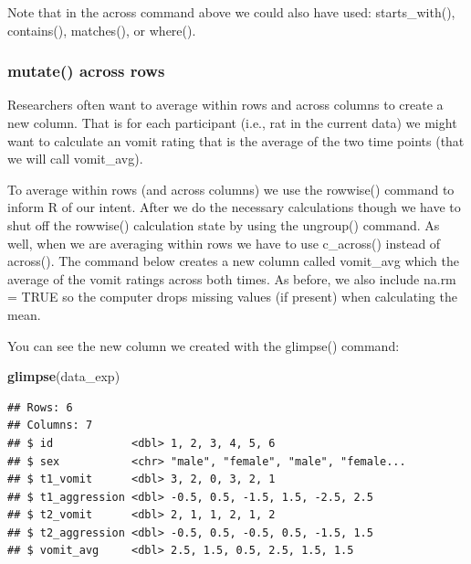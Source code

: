 \documentclass[
]{krantz}
\makeatletter
\newenvironment{Shaded}{\begin{snugshade}}{\end{snugshade}}
\newcommand{\DataTypeTok}[1]{\textcolor[rgb]{0.27,0.27,0.27}{#1}}
\newcommand{\KeywordTok}[1]{\textcolor[rgb]{0.27,0.27,0.27}{\textbf{#1}}}
\newcommand{\NormalTok}[1]{#1}
\newcommand{\OperatorTok}[1]{\textcolor[rgb]{0.43,0.43,0.43}{\textbf{#1}}}
\newcommand{\OtherTok}[1]{\textcolor[rgb]{0.37,0.37,0.37}{#1}}
\newcommand{\StringTok}[1]{\textcolor[rgb]{0.5,0.5,0.5}{#1}}
\newenvironment{kframe}{%
\medskip{}
\setlength{\fboxsep}{.8em}
 \def\at@end@of@kframe{}%
 \ifinner\ifhmode%
  \def\at@end@of@kframe{\end{minipage}}%
  \begin{minipage}{\columnwidth}%
 \fi\fi%
 \def\FrameCommand##1{\hskip\@totalleftmargin \hskip-\fboxsep
 \colorbox{shadecolor}{##1}\hskip-\fboxsep
     \hskip-\linewidth \hskip-\@totalleftmargin \hskip\columnwidth}%
 \MakeFramed {\advance\hsize-\width
   \@totalleftmargin\z@ \linewidth\hsize
   \@setminipage}}%
 {\par\unskip\endMakeFramed%
 \at@end@of@kframe}
\renewenvironment{Shaded}{\begin{kframe}}{\end{kframe}}
\makeatother
\begin{document}
Note that in the across command above we could also have used: starts\_with(), contains(), matches(), or where().

\hypertarget{mutate-across-rows}{%
\subsubsection{mutate() across rows}\label{mutate-across-rows}}

Researchers often want to average within rows and across columns to create a new column. That is for each participant (i.e., rat in the current data) we might want to calculate an vomit rating that is the average of the two time points (that we will call vomit\_avg).

To average within rows (and across columns) we use the rowwise() command to inform R of our intent. After we do the necessary calculations though we have to shut off the rowwise() calculation state by using the ungroup() command. As well, when we are averaging within rows we have to use c\_across() instead of across(). The command below creates a new column called vomit\_avg which the average of the vomit ratings across both times. As before, we also include na.rm = TRUE so the computer drops missing values (if present) when calculating the mean.

\begin{Shaded}
\end{Shaded}

You can see the new column we created with the glimpse() command:

\begin{Shaded}
\begin{Highlighting}[]
\KeywordTok{glimpse}\NormalTok{(data_exp)}
\end{Highlighting}
\end{Shaded}

\begin{verbatim}
## Rows: 6
## Columns: 7
## $ id            <dbl> 1, 2, 3, 4, 5, 6
## $ sex           <chr> "male", "female", "male", "female...
## $ t1_vomit      <dbl> 3, 2, 0, 3, 2, 1
## $ t1_aggression <dbl> -0.5, 0.5, -1.5, 1.5, -2.5, 2.5
## $ t2_vomit      <dbl> 2, 1, 1, 2, 1, 2
## $ t2_aggression <dbl> -0.5, 0.5, -0.5, 0.5, -1.5, 1.5
## $ vomit_avg     <dbl> 2.5, 1.5, 0.5, 2.5, 1.5, 1.5
\end{verbatim}
\end{document}
